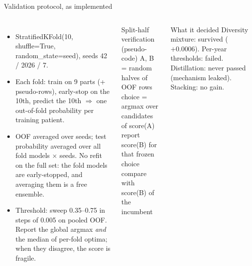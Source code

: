 \documentclass[aspectratio=169,10pt]{beamer}
\newcommand{\code}[1]{{\ttfamily #1}}
\begin{document}
\begin{frame}{Validation protocol, as implemented}
  \begin{columns}[t]
    \footnotesize
    \begin{itemize}\footnotesize
      \item \code{StratifiedKFold(10, shuffle=True, random\_state=seed)}, seeds 42 / 2026 / 7.
      \item Each fold: train on 9 parts (+ pseudo-rows), early-stop on the 10th, predict the 10th
            $\Rightarrow$ one out-of-fold probability per training patient.
      \item OOF averaged over seeds; test probability averaged over all fold models $\times$ seeds.
            No refit on the full set: the fold models are early-stopped, and averaging them is a free ensemble.
      \item Threshold: sweep 0.35--0.75 in steps of 0.005 on pooled OOF. Report the global argmax
            \emph{and} the median of per-fold optima; when they disagree, the score is fragile.
    \end{itemize}
    \footnotesize
    \begin{block}{Split-half verification (pseudo-code)}\scriptsize
      \code{A, B = random halves of OOF rows}\\
      \code{choice = argmax over candidates of score(A)}\\
      \code{report score(B) for that frozen choice}\\
      \code{compare with score(B) of the incumbent}
    \end{block}
    \begin{alertblock}{What it decided}\scriptsize
      Diversity mixture: survived ($+0.0006$). Per-year thresholds: failed. Distillation: never passed
      (mechanism leaked). Stacking: no gain.
    \end{alertblock}
  \end{columns}
\end{frame}
\end{document}
